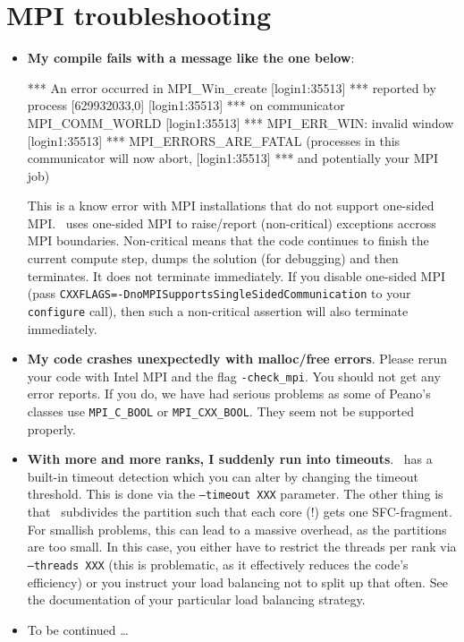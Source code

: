 \section{MPI troubleshooting}
\begin{itemize}
  \item \textbf{My compile fails with a message like the one below}:
  \begin{code}
[login1:35513] *** An error occurred in MPI_Win_create
[login1:35513] *** reported by process [629932033,0]
[login1:35513] *** on communicator MPI_COMM_WORLD
[login1:35513] *** MPI_ERR_WIN: invalid window
[login1:35513] *** MPI_ERRORS_ARE_FATAL (processes in this communicator will now abort,
[login1:35513] ***    and potentially your MPI job)  
  \end{code}
  This is a know error with MPI installations that do not support one-sided MPI. 
  \Peano\ uses one-sided MPI to raise/report (non-critical) exceptions accross MPI boundaries.
  Non-critical means that the code continues to finish the current compute step,
  dumps the solution (for debugging) and then terminates. It does not terminate
		immediately. If you disable one-sided MPI (pass \linebreak \texttt{CXXFLAGS=-DnoMPISupportsSingleSidedCommunication} to your \texttt{configure} call), then such a non-critical assertion
  will also terminate immediately.
  \item \textbf{My code crashes unexpectedly with malloc/free errors}. Please
  rerun your code with Intel MPI and the flag \texttt{-check\_mpi}. You should
  not get any error reports. If you do, we have had serious problems as some of
  Peano's classes use \texttt{MPI\_C\_BOOL} or \texttt{MPI\_CXX\_BOOL}. They
  seem not be supported properly.
  \item \textbf{With more and more ranks, I suddenly run into timeouts}. \Peano\
  has a built-in timeout detection which you can alter by changing the timeout
  threshold. This is done via the \texttt{--timeout XXX} parameter. The other
  thing is that \Peano\ subdivides the partition such that each core (!) gets
  one SFC-fragment. For smallish problems, this can lead to a massive overhead, as
  the partitions are too small. In this case, you either have to restrict the
  threads per rank via \texttt{--threads XXX} (this is problematic, as it
  effectively reduces the code's efficiency) or you instruct your load balancing
  not to split up that often. See the documentation of your particular load
  balancing strategy.
  \item To be continued \dots
\end{itemize}





